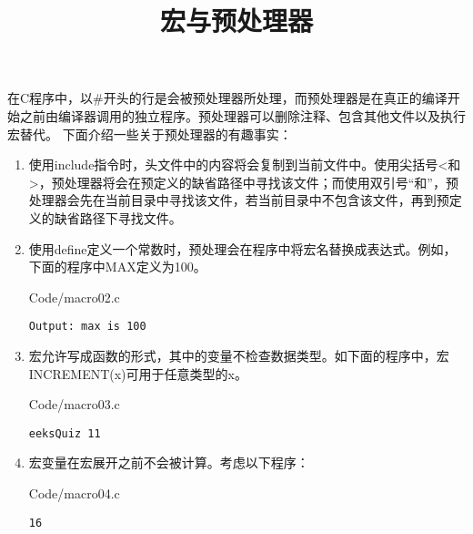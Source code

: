 \documentclass[10pt,a4paper%
tablecaptionabove]{article}
\def\tf{\ttfamily}
\begin{document}
\begin{CJK}{UTF8}{gkai}


 

\newtheorem{li}{例}
\newtheorem{jielun}{结论}
\newtheorem{dingli}{定理}
\newtheorem{mingti}{{命题}} 
\newtheorem{yinli}{{引理}} 
\newtheorem{tuilun}{{推论}}
\newtheorem{dingyi}{{定义}} 
\newtheorem{example}{{例}}
\newtheorem*{example*}{{例}}
\newtheorem*{jie}{{解}}
\newtheorem*{zhengming}{{证明}}
\newtheorem{zhu}{{注}}
\newtheorem*{zhu*}{{注}}
\newtheorem{xingzhi}{{性质}}
\newtheorem{wenti}{{问题}}
\newtheorem{rem}{{Remark}}
\newtheorem{lem}{{Lemma}}
\pagestyle{plain}




\title{宏与预处理器}
\maketitle

在C程序中，以\#开头的行是会被预处理器所处理，而预处理器是在真正的编译开始之前由编译器调用的独立程序。预处理器可以删除注释、包含其他文件以及执行宏替代。 下面介绍一些关于预处理器的有趣事实：
\begin{enumerate}
\item 使用include指令时，头文件中的内容将会复制到当前文件中。使用尖括号{\tf <}和{\tf >}，预处理器将会在预定义的缺省路径中寻找该文件；而使用双引号“和”，预处理器会先在当前目录中寻找该文件，若当前目录中不包含该文件，再到预定义的缺省路径下寻找文件。
\item 使用define定义一个常数时，预处理会在程序中将宏名替换成表达式。例如，下面的程序中MAX定义为100。

{Code/macro02.c}
\begin{lstlisting}[backgroundcolor=\color{red!10}]
Output: max is 100
\end{lstlisting}

\item 宏允许写成函数的形式，其中的变量不检查数据类型。如下面的程序中，宏{\tf INCREMENT(x)}可用于任意类型的{\tf x}。

{Code/macro03.c}
\begin{lstlisting}[backgroundcolor=\color{red!10}]
eeksQuiz 11
\end{lstlisting}

\item 宏变量在宏展开之前不会被计算。考虑以下程序：

{Code/macro04.c}
\begin{lstlisting}[backgroundcolor=\color{red!10}]
16
\end{lstlisting}
 

\end{enumerate}
\end{CJK}
\end{document}
